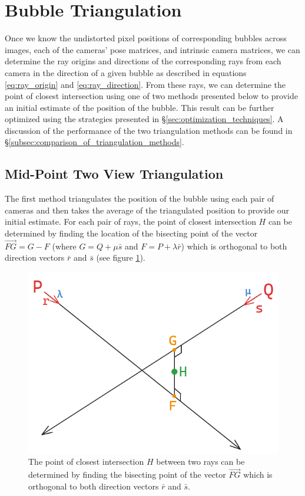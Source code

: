 \documentclass[11pt, letterpaper]{extarticle} %
\begin{document}
\section{Bubble Triangulation} \label{sec:bubble_triangulation}
Once we know the undistorted pixel positions of corresponding bubbles across images, each of the cameras' pose matrices, and intrinsic camera matrices, we can determine the ray origins and directions of the corresponding rays from each camera in the direction of a given bubble as described in equations \ref{eq:ray_origin} and \ref{eq:ray_direction}. From these rays, we can determine the point of closest intersection using one of two methods presented below to provide an initial estimate of the position of the bubble. This result can be further optimized using the strategies presented in \S\ref{sec:optimization_techniques}. A discussion of the performance of the two triangulation methods can be found in \S\ref{subsec:comparison_of_triangulation_methods}.

\subsection{Mid-Point Two View Triangulation} \label{subsec:mid-point_two_view_triangulation}
The first method triangulates the position of the bubble using each pair of cameras and then takes the average of the triangulated position to provide our initial estimate. For each pair of rays, the point of closest intersection $H$ can be determined by finding the location of the bisecting point of the vector $\overrightarrow{FG} = G - F$ (where $G = Q + \mu \bar{s}$ and $F = P + \lambda \bar{r}$) which is orthogonal to both direction vectors $\bar{r}$ and $\bar{s}$ (see figure \ref{fig:mid-point_two_view_triangulation}).

\begin{figure}[h!]
    \centering
    \includegraphics[width=0.6\linewidth]{midpoint_two_view_triangulate.png}
    \caption{The point of closest intersection $H$ between two rays can be determined by finding the bisecting point of the vector $\overrightarrow{FG}$ which is orthogonal to both direction vectors $\bar{r}$ and $\bar{s}$.}
    \label{fig:mid-point_two_view_triangulation}
\end{figure}
\end{document}
